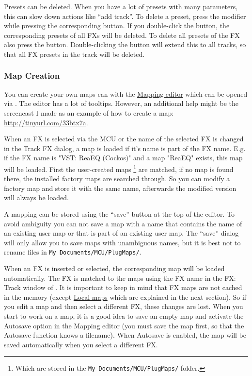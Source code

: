 Presets can be deleted. When you have a lot of presets with many
parameters, this can slow down actions like ``add track''. To delete a
preset, press the \option modifier while pressing the corresponding
\rec button. If you double-click the \rec button, the corresponding
presets of all FXs will be deleted. To delete all presets of the FX
also press the \alt button. Double-clicking the \rec button will
extend this to all tracks, so that all FX presets in the track will be
deleted.

\subsubsection{Map Creation}\label{createmaps}

You can create your own maps can with the
\hyperref[F:Screenshot_Plug_Mode]{Mapping editor} which can be opened
via \alt \plug. The editor has a lot of tooltips. However, an
additional help might be the screencast I made as an example of how to
create a map: \url{http://tinyurl.com/33btx7a}.

When an FX is selected via the MCU or the name of the selected FX is
changed in the Track FX dialog, a map is loaded if it's name is part
of the FX name. E.g.  if the FX name is "VST: ReaEQ (Cockos)" and a
map "ReaEQ" exists, this map will be loaded. First the user-created
maps \footnote{Which are stored in the {\tt My
    Documents/MCU/PlugMaps/} folder.} are matched, if no map is found
there, the installed factory maps are searched through. So you can
modify a factory map and store it with the same name, afterwards the
modified version will always be loaded.

A mapping can be stored using the ``save'' button at the top of the editor. To
avoid ambiguity you can not  save a map with a name that contains the
name of an  existing user map or that is part of an existing user map.
The ``save'' dialog will only allow you to save maps with
unambiguous names, but it is best not to rename files in {\tt My
Documents/MCU/PlugMaps/}.

When an FX is inserted or selected, the corresponding map will be
loaded automatically. The FX is matched to the maps using the FX name
in the FX: Track window of \reaper. It is important to keep in mind
that FX maps are not cached in the memory (except
\hyperref[localmaps]{Local maps} which are explained in the next
section). So if you edit a map and then select a different FX, these
changes are lost. When you start to work on a map, it is a good idea
to save an empty map and activate the Autosave option in the Mapping
editor (you must save the map first, so that the Autosave function
knows a filename). When Autosave is enabled, the map will be saved
automatically when you select a different FX.

